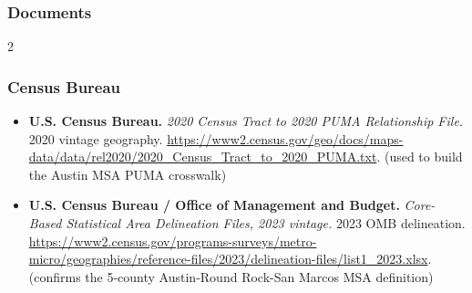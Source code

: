 \subsubsection*{Documents}
{\scriptsize\renewcommand{\baselinestretch}{0.88}\selectfont\raggedright
\begin{multicols}{2}
\setlength{\parskip}{0pt}
\subsubsection*{Census Bureau}
\begin{itemize}[itemsep=0pt,topsep=1pt,parsep=0pt,partopsep=0pt,leftmargin=1em]
\item \textbf{U.S. Census Bureau.} \textit{2020 Census Tract to 2020 PUMA Relationship File.} 2020 vintage geography. \url{https://www2.census.gov/geo/docs/maps-data/data/rel2020/2020_Census_Tract_to_2020_PUMA.txt}. {\color{ammuted}(used to build the Austin MSA PUMA crosswalk)}
\item \textbf{U.S. Census Bureau / Office of Management and Budget.} \textit{Core-Based Statistical Area Delineation Files, 2023 vintage.} 2023 OMB delineation. \url{https://www2.census.gov/programs-surveys/metro-micro/geographies/reference-files/2023/delineation-files/list1_2023.xlsx}. {\color{ammuted}(confirms the 5-county Austin-Round Rock-San Marcos MSA definition)}
\end{itemize}

\end{multicols}}
